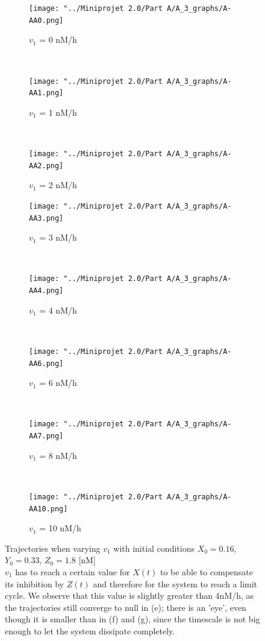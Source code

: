 \documentclass[10pt,a4paper,oneside,twocolumn]{article}
\numberwithin{equation}{section} %
\begin{document}
    \begin{figure}
    \centering
	\begin{subfigure}[b]{0.32\textwidth}
	    \texttt{[image: "../Miniprojet 2.0/Part A/A\_3\_graphs/A-AA0.png]}
	    \caption{$v_1$ = 0 nM/h}
	\end{subfigure}
	~ 
	\begin{subfigure}[b]{0.32\textwidth}
	    \texttt{[image: "../Miniprojet 2.0/Part A/A\_3\_graphs/A-AA1.png]}
	    \caption{$v_1$ = 1 nM/h}
	\end{subfigure}
	~ 
	\begin{subfigure}[b]{0.32\textwidth}
	    \texttt{[image: "../Miniprojet 2.0/Part A/A\_3\_graphs/A-AA2.png]}
	    \caption{$v_1$ = 2 nM/h}
	\end{subfigure}
	 
	\begin{subfigure}[b]{0.32\textwidth}
	    \texttt{[image: "../Miniprojet 2.0/Part A/A\_3\_graphs/A-AA3.png]}
	    \caption{$v_1$ = 3 nM/h}
	\end{subfigure}
	~ 
	\begin{subfigure}[b]{0.32\textwidth}
	    \texttt{[image: "../Miniprojet 2.0/Part A/A\_3\_graphs/A-AA4.png]}
	    \caption{$v_1$ = 4 nM/h}
	\end{subfigure}
	~
	\begin{subfigure}[b]{0.32\textwidth}
	    \texttt{[image: "../Miniprojet 2.0/Part A/A\_3\_graphs/A-AA6.png]}
	    \caption{$v_1$ = 6 nM/h}
	\end{subfigure}
	~ 
	\begin{subfigure}[b]{0.32\textwidth}
	    \texttt{[image: "../Miniprojet 2.0/Part A/A\_3\_graphs/A-AA7.png]}
	    \caption{$v_1$ = 8 nM/h}
	\end{subfigure}
	~
	\begin{subfigure}[b]{0.32\textwidth}
	    \texttt{[image: "../Miniprojet 2.0/Part A/A\_3\_graphs/A-AA10.png]}
	    \caption{$v_1$ = 10 nM/h}
	\end{subfigure}
	
	\caption{Trajectories when varying $v_1$ with initial conditions $X_0 = 0.16$, $Y_0 = 0.33 $, $Z_0 = 1.8$ [nM]\\
	$v_1$ has to reach a certain value for $X(t)$ to be able to compensate its inhibition by $Z(t)$ and therefore for the system to reach a limit cycle. We observe that this value is slightly greater than 4nM/h, as the trajectories still converge to null in (e); there is an 'eye', even though it is smaller than in (f) and (g), since the timescale is not big enough to let the system dissipate completely.
	}
    \end{figure}
\end{document}
